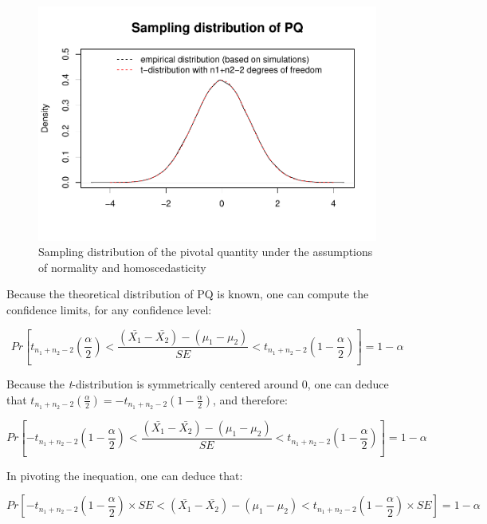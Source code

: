 \documentclass[
  man,floatsintext]{apa6}
\begin{document}
\begin{figure}
\centering
\includegraphics{Appendix2_files/figure-latex/SAMPLMEANDIFF1-1.pdf}
\caption{\label{fig:SAMPLMEANDIFF1}Sampling distribution of the pivotal quantity under the assumptions of normality and homoscedasticity}
\end{figure}

Because the theoretical distribution of PQ is known, one can compute the confidence limits, for any confidence level:

\begin{equation} 
Pr[t_{n_1+n_2-2}(\frac{\alpha}{2}) < \frac{(\bar{X_1}-\bar{X_2})-(\mu_1-\mu_2)}{SE} < t_{n_1+n_2-2}(1-\frac{\alpha}{2})] = 1 - \alpha
\label{eq:conflev1}
\end{equation}

Because the \emph{t}-distribution is symmetrically centered around 0, one can deduce that \(t_{n_1+n_2-2}(\frac{\alpha}{2})=-t_{n_1+n_2-2}(1-\frac{\alpha}{2})\), and therefore:

\begin{equation} 
Pr[-t_{n_1+n_2-2}(1-\frac{\alpha}{2}) < \frac{(\bar{X_1}-\bar{X_2})-(\mu_1-\mu_2)}{SE} < t_{n_1+n_2-2}(1-\frac{\alpha}{2})] = 1 - \alpha
\label{eq:conflev2}
\end{equation}

In pivoting the inequation, one can deduce that:

\begin{equation} 
Pr[-t_{n_1+n_2-2}(1-\frac{\alpha}{2}) \times SE < (\bar{X_1}-\bar{X_2})-(\mu_1-\mu_2) < t_{n_1+n_2-2}(1-\frac{\alpha}{2}) \times SE] = 1-\alpha
\label{eq:conflev3}
\end{equation}
\end{document}
